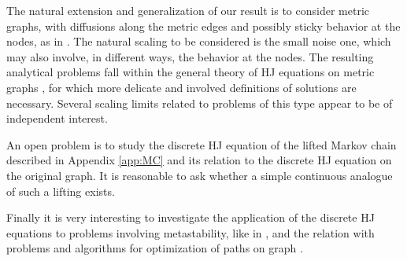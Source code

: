 \documentclass[reqno]{amsart}
\theoremstyle{plain}
\theoremstyle{definition}
\theoremstyle{remark}
\numberwithin{equation}{section}
\numberwithin{theorem}{section}
\newcommand{\<}{\langle}
\renewcommand{\>}{\rangle}
\begin{document}
\smallskip

The natural extension and generalization of our result is to consider metric graphs, with diffusions along the metric edges and possibly sticky behavior at the nodes, as in \cite{ACG}. The natural scaling to be considered is the small noise one, which may also involve, in  different ways, the behavior at the nodes. The resulting analytical problems fall within the general theory of HJ equations on metric graphs \cite{CM}, for which more delicate and involved definitions of solutions are necessary. Several scaling limits related to problems of this type appear to be of independent interest.

\smallskip

An open problem is to study the discrete HJ equation of the lifted Markov chain described in Appendix \ref{app:MC} and its relation to the discrete HJ equation on the original graph. It is reasonable to ask whether a simple continuous analogue of such a lifting exists.

\smallskip


Finally it is very interesting to investigate the application of the discrete HJ equations to problems involving metastability, like in \cite{OS1, OS2, S1, S2, S3}, and the relation with problems and algorithms for optimization of paths on graph \cite{Sch}.

\appendix
\end{document}

